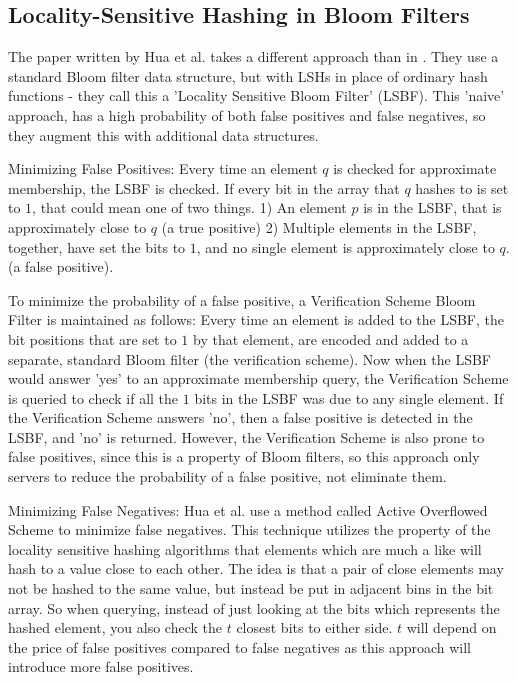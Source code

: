 \documentclass[a4paper,11pt]{article}
\begin{document}
\subsection{Locality-Sensitive Hashing in Bloom Filters}
The paper written \cite{paper:hua} by Hua et al. takes a different approach than in \cite{paper:harvard}. They use a standard Bloom filter data structure, but with LSHs in place of ordinary hash functions - they call this a 'Locality Sensitive Bloom Filter' (LSBF). This 'naive' approach, has a high probability of both false positives and false negatives, so they augment this with additional data structures.

Minimizing False Positives:
Every time an element $q$ is checked for approximate membership, the LSBF is checked. If every bit in the array that $q$ hashes to is set to $1$, that could mean one of two things.
1) An element $p$ is in the LSBF, that is approximately close to $q$ (a true positive)
2) Multiple elements in the LSBF, together, have set the bits to $1$, and no single element is approximately close to $q$. (a false positive).

To minimize the probability of a false positive, a Verification Scheme Bloom Filter is maintained as follows: Every time an element is added to the LSBF, the bit positions that are set to $1$ by that element, are encoded and added to a separate, standard Bloom filter (the verification scheme). Now when the LSBF would answer 'yes' to an approximate membership query, the Verification Scheme is queried to check if all the $1$ bits in the LSBF was due to any single element. If the Verification Scheme answers 'no', then a false positive is detected in the LSBF, and 'no' is returned. However, the Verification Scheme is also prone to false positives, since this is a property of Bloom filters, so this approach only servers to reduce the probability of a false positive, not eliminate them.

Minimizing False Negatives:
Hua et al. use a method called Active Overflowed Scheme to minimize false negatives. This technique utilizes the property of the locality sensitive hashing algorithms that elements which are much a like will hash to a value close to each other. The idea is that a pair of close elements may not be hashed to the same value, but instead be put in adjacent bins in the bit array. So when querying, instead of just looking at the bits which represents the hashed element, you also check the $t$ closest bits to either side. $t$ will depend on the price of false positives compared to false negatives as this approach will introduce more false positives.
\end{document}

